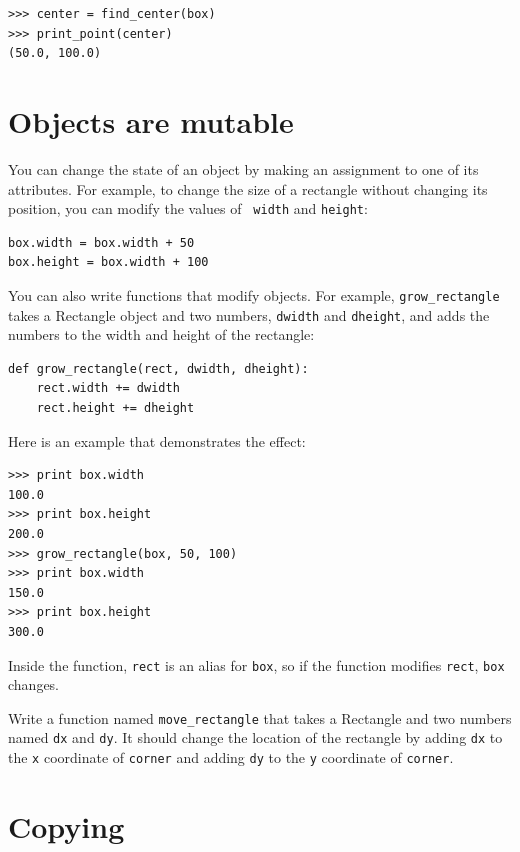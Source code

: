 \documentclass[10pt]{book}
\begin{document}
\begin{verbatim}
>>> center = find_center(box)
>>> print_point(center)
(50.0, 100.0)
\end{verbatim}
%

\section{Objects are mutable}

You can change the state of an object by making an assignment to one of
its attributes.  For example, to change the size of a rectangle
without changing its position, you can modify the values of {\tt
width} and {\tt height}:

\begin{verbatim}
box.width = box.width + 50
box.height = box.width + 100
\end{verbatim}
%
You can also write functions that modify objects.  For example,
\verb"grow_rectangle" takes a Rectangle object and two numbers,
{\tt dwidth} and {\tt dheight}, and adds the numbers to the
width and height of the rectangle:

\begin{verbatim}
def grow_rectangle(rect, dwidth, dheight):
    rect.width += dwidth
    rect.height += dheight
\end{verbatim}
%
Here is an example that demonstrates the effect:

\begin{verbatim}
>>> print box.width
100.0
>>> print box.height
200.0
>>> grow_rectangle(box, 50, 100)
>>> print box.width
150.0
>>> print box.height
300.0
\end{verbatim}
%
Inside the function, {\tt rect} is an
alias for {\tt box}, so if the function modifies {\tt rect}, 
{\tt box} changes.

\begin{exercise}

Write a function named \verb"move_rectangle" that takes
a Rectangle and two numbers named {\tt dx} and {\tt dy}.  It
should change the location of the rectangle by adding {\tt dx}
to the {\tt x} coordinate of {\tt corner} and adding {\tt dy}
to the {\tt y} coordinate of {\tt corner}.

\end{exercise}


\section{Copying}
\label{copying}
\end{document}
